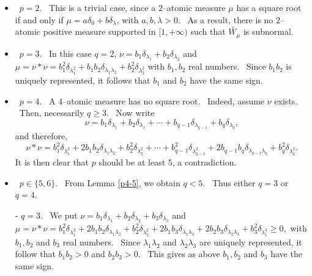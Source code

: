 \documentclass[12pt]{amsart}
\begin{document}
\begin{itemize}
    \item \ $p= 2$. \ This is a trivial case, since a $2$--atomic measure $\mu$ has a square root if and only if $\mu= a\delta_0+b\delta_\lambda$, with $a, b, \lambda>0$. \ As a result, there is no $2$--atomic positive measure supported in $[1, +\infty)$ such that $\widetilde{ W_\mu}$ is subnormal.
    \item \ $p= 3$. \ In this case $q=2$, $\nu= b_1 \delta_{\lambda_1}+b_2 \delta_{\lambda_2}$ and $\mu =\nu*\nu =  b_1^2 \delta_{\lambda_1^2}+b_1b_2 \delta_{\lambda_1\lambda_2}+ b_2^2 \delta_{\lambda_2^2}$ with $b_1, b_2$ real numbers. \ Since $b_1b_2$ is uniquely represented, it follows that $b_1$ and $b_2$ have the same sign. \ 
    \item \ $p= 4$. \ A $4$--atomic measure has no square root. \ Indeed, assume $\nu$ exists. \ Then, necessarily   $q\ge 3$. \ Now write 
    $$
    \nu= b_1 \delta_{\lambda_1}+b_2 \delta_{\lambda_1}+ \cdots +  b_{q-1} \delta_{\lambda_{q-1}} +  b_q \delta_{\lambda_q},
    $$
    and therefore, 
    $$
    \nu*\nu = b_1^2 \delta_{\lambda_1^2}+2b_1b_2 \delta_{\lambda_1\lambda_2}+b_2^2\delta_{\lambda_2^2}+\cdots+ b_{q-1}^2 \delta_{\lambda_{q-1}^2}+2b_{q-1}b_{q} \delta_{\lambda_{q-1}\lambda_{q}}+ b_{q}^2 \delta_{\lambda_{q}^2}.
    $$
    It is then clear that $p$ should be at least $5$, a contradiction.
    
    \item \ $p\in \{5, 6\}$. \ From Lemma \ref{p4-5}, we obtain  $q < 5$. \ Thus either  $q =3$ or $q=4$.

-  $q= 3$. \ We put $\nu= b_1 \delta_{\lambda_1}+b_2 \delta_{\lambda_2}+b_3 \delta_{\lambda_3}$ and $\mu=\nu*\nu = b_1^2 \delta_{\lambda_1^2}+2b_1b_2 \delta_{\lambda_1\lambda_2}+b_2^2 \delta_{\lambda_2^2}+2b_1b_3 \delta_{\lambda_1\lambda_3}+2b_2b_3 \delta_{\lambda_2\lambda_3}+ b_3^2 \delta_{\lambda_1^3}\ge 0,$ with $b_1, b_2$ and $b_3$ real numbers. \ Since $ \lambda_1\lambda_2$ and $ \lambda_2\lambda_3$ are uniquely represented, it follow that $b_1b_2>0$ and $b_2b_3>0$. \ This gives as above $b_1, b_2$ and $b_3$ have the same sign.


\end{itemize}
\end{document}
